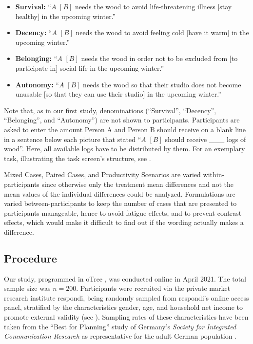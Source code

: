 \documentclass[10pt,letterpaper]{article}
\begin{document}
\begin{itemize}
   \item \textbf{Survival:} ``$A$ $[B]$ needs the wood to avoid life-threatening illness [stay healthy] in the upcoming winter.''
   \item \textbf{Decency:} ``$A$ $[B]$ needs the wood to avoid feeling cold [have it warm] in the upcoming winter.''
   \item \textbf{Belonging:} ``$A$ $[B]$ needs the wood in order not to be excluded from [to participate in] social life in the upcoming winter.''
   \item \textbf{Autonomy:} ``$A$ $[B]$ needs the wood so that their studio does not become unusable [so that they can use their studio] in the upcoming winter.''
\end{itemize}

Note that, as in our first study, denominations (``Survival'', ``Decency'', ``Belonging'', and ``Autonomy'') are not shown to participants.
Participants are asked to enter the amount Person A and Person B should receive on a blank line in a sentence below each picture that stated ``$A$ $[B]$ should receive \_\_\_ logs of wood''.
Here, all available logs have to be distributed by them.
For an exemplary task, illustrating the task screen's structure, see .

Mixed Cases, Paired Cases, and Productivity Scenarios are varied within-participants since otherwise only the treatment mean differences and not the mean values of the individual differences could be analyzed.
Formulations are varied between-participants to keep the number of cases that are presented to participants manageable, hence to avoid fatigue effects, and to prevent contrast effects, which would make it difficult to find out if the wording actually makes a difference.


\subsection*{Procedure}
Our study, programmed in oTree \cite{chen_otree_2016}, was conducted online in April 2021.
The total sample size was $n=200$.
Participants were recruited via the private market research institute respondi, being randomly sampled from respondi's online access panel, stratified by the characteristics gender, age, and household net income to promote external validity (see ).
Sampling rates of these characteristics have been taken from the ``Best for Planning'' study of Germany's \textit{Society for Integrated Communication Research} as representative for the adult German population \cite[p. 284, 291]{gesellschaft_fur_integrierte_kommunikationsforschung_best_2019}.
\end{document}
